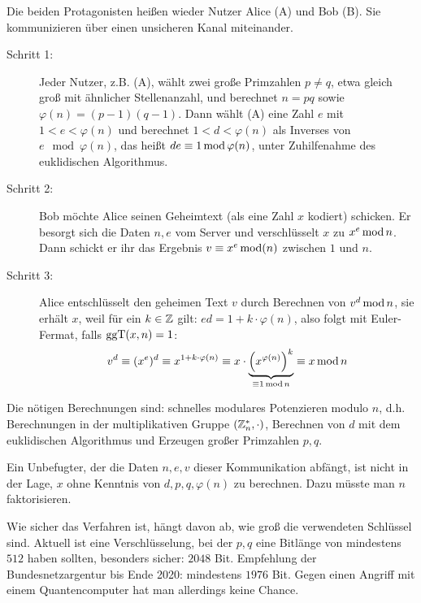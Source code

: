 \begin{anw}
	Die beiden Protagonisten heißen wieder Nutzer Alice (A) und Bob (B). 
	Sie kommunizieren über einen unsicheren Kanal miteinander.
	\begin{description}
		\item[Schritt 1:] Jeder Nutzer, z.B. (A), wählt zwei große Primzahlen $p \neq q$, etwa gleich groß mit ähnlicher Stellenanzahl, und berechnet $n = pq$ sowie $\varphi(n) = (p-1)(q-1)$. 
		Dann wählt (A) eine Zahl $e$ mit $1<e<\varphi(n)$ und berechnet $1 < d < \varphi(n)$ als Inverses von $e \mod \varphi(n)$, das heißt $de \kon 1 \modu \varphi(n)$, unter Zuhilfenahme des euklidischen Algorithmus.
		\item[Schritt 2:] Bob möchte Alice seinen Geheimtext (als eine Zahl $x$ kodiert) schicken. 
		Er besorgt sich die Daten $n,e$ vom Server und verschlüsselt $x$ zu $x^e \modu n$. 
		Dann schickt er ihr das Ergebnis $v \kon x^e \modu (n)$ zwischen $1$ und $n$.
		\item[Schritt 3:] Alice entschlüsselt den geheimen Text $v$ durch Berechnen von $v^d \modu n$, sie erhält $x$, weil für ein $k \in \ZZ$ gilt: $ed = 1 + k \cdot \varphi(n)$, also folgt mit Euler-Fermat, falls $\ggT(x,n) = 1$:
		\[ v^d \kon (x^e)^d \kon x^{1+k\cdot \varphi(n)} \kon x \cdot \underbrace{\enbrace*{x^{\varphi(n)}}^k}_{\kon 1 \modu n} \kon x \modu n\]
	\end{description}
\end{anw}

\begin{bem}
	Die nötigen Berechnungen sind: schnelles modulares Potenzieren modulo $n$, d.h. Berechnungen in der multiplikativen Gruppe $(\ZZ_n^*,\cdot)$, Berechnen von $d$ mit dem euklidischen Algorithmus und Erzeugen großer Primzahlen $p,q$.
\end{bem}

\begin{bem}
	Ein Unbefugter, der die Daten $n,e,v$ dieser Kommunikation abfängt, ist nicht in der Lage, $x$ ohne Kenntnis von $d,p,q,\varphi(n)$ zu berechnen. 
	Dazu müsste man $n$ faktorisieren.
\end{bem}

\begin{bem}
	Wie sicher das Verfahren ist, hängt davon ab, wie groß die verwendeten Schlüssel sind. 
	Aktuell ist eine Verschlüsselung, bei der $p,q$ eine Bitlänge von mindestens $512$ haben sollten, besonders sicher: $2048$ Bit. 
	Empfehlung der Bundesnetzargentur bis Ende 2020: mindestens $1976$ Bit. 
	Gegen einen Angriff mit einem Quantencomputer hat man allerdings keine Chance.
\end{bem}

